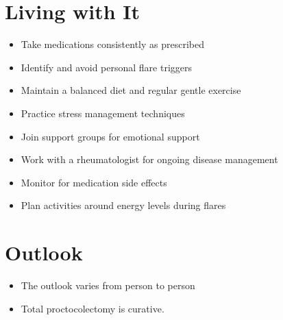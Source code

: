 \section{Living with It}
\begin{itemize}[noitemsep]
  \item Take medications consistently as prescribed
  \item Identify and avoid personal flare triggers
  \item Maintain a balanced diet and regular gentle exercise
  \item Practice stress management techniques
  \item Join support groups for emotional support
  \item Work with a rheumatologist for ongoing disease management
  \item Monitor for medication side effects
  \item Plan activities around energy levels during flares
\end{itemize}
\section{Outlook}
\begin{itemize}[noitemsep]
  \item The outlook varies from person to person
  \item Total proctocolectomy is curative.
\end{itemize}
